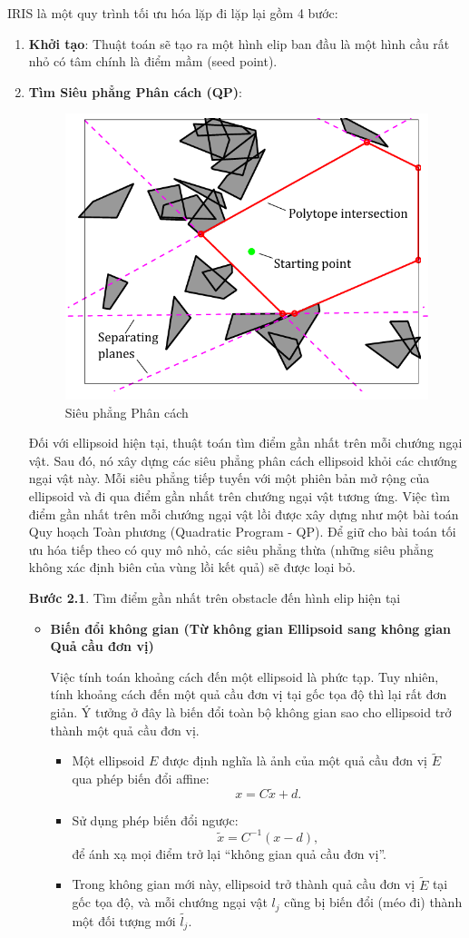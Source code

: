 \documentclass{article}
\begin{document}
IRIS là một quy trình tối ưu hóa lặp đi lặp lại gồm 4 bước:
\begin{enumerate}
\item \textbf{Khởi tạo}: Thuật toán sẽ tạo ra một hình elip ban đầu là một hình cầu rất nhỏ có tâm chính là điểm mầm (seed point).
\item \textbf{Tìm Siêu phẳng Phân cách (QP)}: 

\begin{figure}[!htp]
    \centering
    \includegraphics[width=0.5\linewidth]{imgs/iris_algo_1.png}
    \caption{Siêu phẳng Phân cách}
\end{figure}

Đối với ellipsoid hiện tại, thuật toán tìm điểm gần nhất trên mỗi chướng ngại vật. Sau đó, nó xây dựng các siêu phẳng phân cách ellipsoid khỏi các chướng ngại vật này. Mỗi siêu phẳng tiếp tuyến với một phiên bản mở rộng của ellipsoid và đi qua điểm gần nhất trên chướng ngại vật tương ứng. Việc tìm điểm gần nhất trên mỗi chướng ngại vật lồi được xây dựng như một bài toán Quy hoạch Toàn phương (Quadratic Program - QP). Để giữ cho bài toán tối ưu hóa tiếp theo có quy mô nhỏ, các siêu phẳng thừa (những siêu phẳng không xác định biên của vùng lồi kết quả) sẽ được loại bỏ.

\textbf{Bước 2.1}. Tìm điểm gần nhất trên obstacle đến hình elip hiện tại
\begin{itemize}
\item \textbf{Biến đổi không gian (Từ không gian Ellipsoid sang không gian Quả cầu đơn vị)}  

Việc tính toán khoảng cách đến một ellipsoid là phức tạp. Tuy nhiên, tính khoảng cách đến một quả cầu đơn vị tại gốc tọa độ thì lại rất đơn giản. Ý tưởng ở đây là biến đổi toàn bộ không gian sao cho ellipsoid trở thành một quả cầu đơn vị.

\begin{itemize}
    \item Một ellipsoid $E$ được định nghĩa là ảnh của một quả cầu đơn vị $\tilde{E}$ qua phép biến đổi affine:
    \[
    x = C\tilde{x} + d.
    \]
    \item Sử dụng phép biến đổi ngược:
    \[
    \tilde{x} = C^{-1}(x - d),
    \]
    để ánh xạ mọi điểm trở lại “không gian quả cầu đơn vị”.
    \item Trong không gian mới này, ellipsoid trở thành quả cầu đơn vị $\tilde{E}$ tại gốc tọa độ, và mỗi chướng ngại vật $l_j$ cũng bị biến đổi (méo đi) thành một đối tượng mới $\tilde{l_j}$.
\end{itemize}
\end{itemize}


\end{enumerate}
\end{document}
